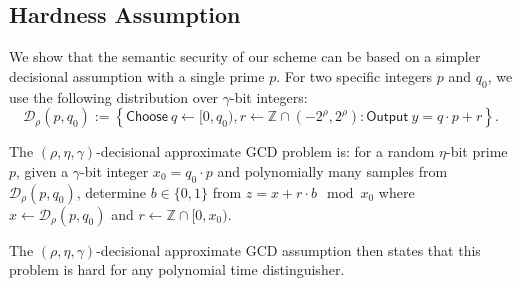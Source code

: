 \documentclass{llncs}
\newcommand{\Z}{{\mathbb Z}}
\newcommand*\Choose{\ensuremath{\mathsf{Choose}\ }}
\newcommand*\Output{\ensuremath{\mathsf{Output}\ }}
\newcommand*\D{\ensuremath{\mathcal D}}
\begin{document}
\subsection{Hardness Assumption}\label{decisional_assumption}

We show that the semantic security of our scheme can be based on a
simpler decisional assumption with a single prime $p$. 
 For two specific
integers $p$ and $q_0$, we use the following distribution over
$\gamma$-bit integers:  
\[ \D_\rho(p,q_0) := \left\{ \Choose q\gets [0, q_0),
  r\gets \Z\cap (-2^\rho, 2^\rho) : \Output y=q\cdot p+r
  \right\}. \] 

\begin{definition}
\label{def:dagcd}
The $(\rho,\eta,\gamma)$-decisional approximate GCD problem is: for a random $\eta$-bit prime $p$, given a $\gamma$-bit integer  $x_0=q_0\cdot p$ and polynomially many samples from $\D_{\rho}(p,q_0)$,
determine $b\in\{0,1\}$ from $z=x+r\cdot b\mod x_0$ where $x\gets\D_{\rho}(p,q_0)$ and $r\gets\Z\cap[0,x_0)$.
\end{definition}

The $(\rho,\eta,\gamma)$-decisional approximate GCD assumption then states that this problem is hard for any polynomial time distinguisher.
\end{document}
